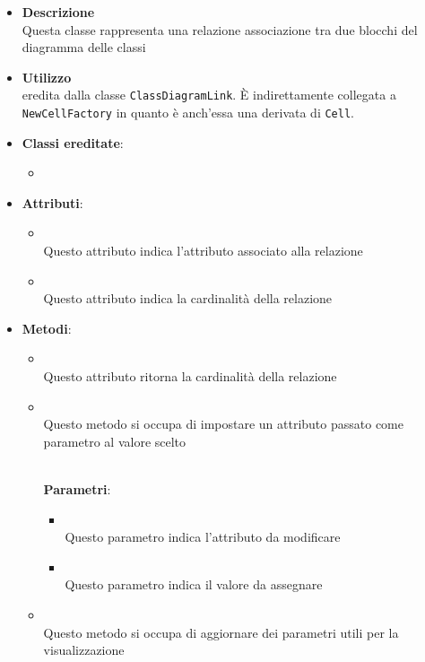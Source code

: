 \label{\nogloxy{swedesigner::client::model::celltypes::class::HxAssociation}}
\begin{itemize}
\item \textbf{Descrizione}\\
Questa classe rappresenta una relazione associazione tra due blocchi del diagramma delle classi
\item \textbf{Utilizzo}\\
eredita dalla classe \texttt{ClassDiagramLink}. È indirettamente collegata a \texttt{NewCellFactory} in quanto è anch'essa una derivata di \texttt{Cell}.
\item \textbf{Classi ereditate}:
\begin{itemize}
\item \hyperref[\nogloxy{swedesigner::client::model::celltypes::class::ClassDiagramLink}]{}
\end{itemize}
\item \textbf{Attributi}:
\begin{itemize}
\item {}
\\ Questo attributo indica l'attributo associato alla relazione
\item {}
\\ Questo attributo indica la cardinalità della relazione
\end{itemize}
\item \textbf{Metodi}:
\begin{itemize}
\item {}
\\ Questo attributo ritorna la cardinalità della relazione
\item {}
\\ Questo metodo si occupa di impostare un attributo passato come parametro al valore scelto

\\ \textbf{Parametri}:
\begin{itemize}
\item {}
\\ Questo parametro indica l'attributo da modificare

\item {}
\\ Questo parametro indica il valore da assegnare

\end{itemize}
\item {}
\\ Questo metodo si occupa di aggiornare dei parametri utili per la visualizzazione
\end{itemize}
\end{itemize}

